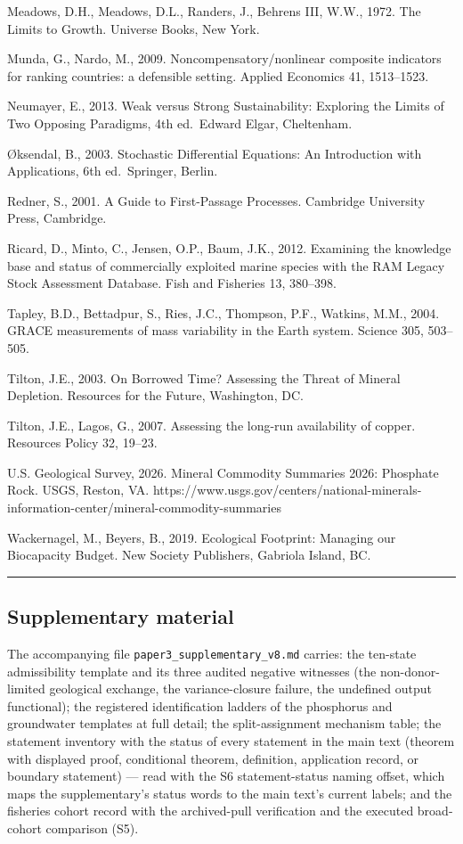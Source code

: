 \documentclass[11pt]{article}
\begin{document}
Meadows, D.H., Meadows, D.L., Randers, J., Behrens III, W.W., 1972. The
Limits to Growth. Universe Books, New York.

Munda, G., Nardo, M., 2009. Noncompensatory/nonlinear composite
indicators for ranking countries: a defensible setting. Applied
Economics 41, 1513--1523.

Neumayer, E., 2013. Weak versus Strong Sustainability: Exploring the
Limits of Two Opposing Paradigms, 4th ed.~Edward Elgar, Cheltenham.

\O{}ksendal, B., 2003. Stochastic Differential Equations: An Introduction
with Applications, 6th ed.~Springer, Berlin.

Redner, S., 2001. A Guide to First-Passage Processes. Cambridge
University Press, Cambridge.

Ricard, D., Minto, C., Jensen, O.P., Baum, J.K., 2012. Examining the
knowledge base and status of commercially exploited marine species with
the RAM Legacy Stock Assessment Database. Fish and Fisheries 13,
380--398.

Tapley, B.D., Bettadpur, S., Ries, J.C., Thompson, P.F., Watkins, M.M.,
2004. GRACE measurements of mass variability in the Earth system.
Science 305, 503--505.

Tilton, J.E., 2003. On Borrowed Time? Assessing the Threat of Mineral
Depletion. Resources for the Future, Washington, DC.

Tilton, J.E., Lagos, G., 2007. Assessing the long-run availability of
copper. Resources Policy 32, 19--23.

U.S. Geological Survey, 2026. Mineral Commodity Summaries 2026:
Phosphate Rock. USGS, Reston, VA.
https://www.usgs.gov/centers/national-minerals-information-center/mineral-commodity-summaries

Wackernagel, M., Beyers, B., 2019. Ecological Footprint: Managing our
Biocapacity Budget. New Society Publishers, Gabriola Island, BC.

\begin{center}\rule{0.5\linewidth}{0.5pt}\end{center}

\subsection{Supplementary material}\label{supplementary-material}

The accompanying file \texttt{paper3\_supplementary\_v8.md} carries: the
ten-state admissibility template and its three audited negative
witnesses (the non-donor-limited geological exchange, the
variance-closure failure, the undefined output functional); the
registered identification ladders of the phosphorus and groundwater
templates at full detail; the split-assignment mechanism table; the
statement inventory with the status of every statement in the main text
(theorem with displayed proof, conditional theorem, definition,
application record, or boundary statement) --- read with the S6
statement-status naming offset, which maps the supplementary's status
words to the main text's current labels; and the fisheries cohort record
with the archived-pull verification and the executed broad-cohort
comparison (S5).
\end{document}
